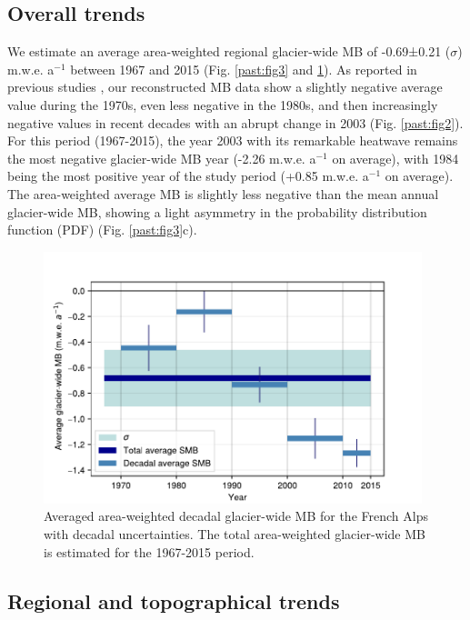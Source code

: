 \subsection{Overall trends} \label{past:overview:overall}

We estimate an average area-weighted regional glacier-wide MB of -0.69±0.21 ($\sigma$) m.w.e. a$^{-1}$ between 1967 and 2015 (Fig. \ref{past:fig3} and \ref{past:fig4}). As reported in previous studies \citep{huss_extrapolating_2012, rabatel_spatio-temporal_2016, vincent_common_2017}, our reconstructed MB data show a slightly negative average value during the 1970s, even less negative in the 1980s, and then increasingly negative values in recent decades with an abrupt change in 2003 (Fig. \ref{past:fig2}). For this period (1967-2015), the year 2003 with its remarkable heatwave remains the most negative glacier-wide MB year (-2.26 m.w.e. a$^{-1}$ on average), with 1984 being the most positive year of the study period (+0.85 m.w.e. a$^{-1}$ on average). The area-weighted average MB is slightly less negative than the mean annual glacier-wide MB, showing a light asymmetry in the probability distribution function (PDF) (Fig. \ref{past:fig3}c). 

\begin{figure}[t]
\centering
\includegraphics[width=11cm]{Figures/past/Figure_4.pdf}
\captionsetup{justification=centering}
\caption{Averaged area-weighted decadal glacier-wide MB for the French Alps with decadal uncertainties.  The total area-weighted glacier-wide MB is estimated for the 1967-2015 period.}
\label{past:fig4}
\end{figure}

\subsection{Regional and topographical trends} \label{past:overview:regional}

